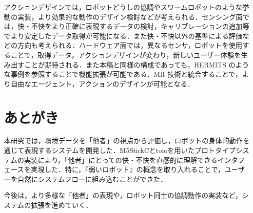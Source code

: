 \documentclass[paper=a4paper,jafontsize=9pt,head_space=15mm,gutter=20mm,
twocolumn,number_of_lines=49, line_length=26zw]{myuarticle}
\begin{document}
アクションデザインでは，ロボットどうしの協調やスワームロボットのような挙動の実装，より効果的な動作のデザイン検討などが考えられる．センシング面では，快・不快をより正確に表現するデータの検討，キャリブレーションの追加等でより安定したデータ取得が可能になる．また快・不快以外の基準による評価などの方向も考えられる．ハードウェア面では，異なるセンサ，ロボットを使用することで，取得データ，アクションデザインが変わり，新しいユーザー体験を生み出すことが期待される．また本稿と同様の構成であっても，HERMITS のような事例を参照することで機能拡張が可能である．MR 技術と統合することで，より自由なエージェント，アクションのデザインが可能となる．

\section{あとがき}
本研究では，環境データを「他者」の視点から評価し，ロボットの身体的動作を通じて表現するシステムを開発した．M5StickCとtoioを用いたプロトタイプシステムの実装により，「他者」にとっての快・不快を直感的に理解できるインタフェースを実現した．特に，『弱いロボット』の概念を取り入れることで，ユーザーを自然にシステムフローに組み込むことができた．

今後は，より多様な「他者」の表現や，ロボット同士の協調動作の実装など，システムの拡張を進めていく．

\renewcommand{\refname}{　参考文献}


\end{document}
